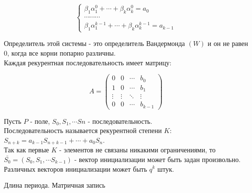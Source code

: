 \begin{equation*}
 \begin{cases}
    \beta_1\alpha_1^0 + \cdots + \beta_k\alpha_k^0 = a_0\\
    \cdots \cdots \cdots\\
    \beta_1\alpha_1^{k-1} + \cdots + \beta_k\alpha_k^{k-1} = a_{k-1}
 \end{cases}
\end{equation*}

Определитель этой системы - это определитель Вандермонда $(W)$ и он не равен 0,
когда все корни попарно различны.\\
Каждая рекурентная последовательность имеет матрицу:

\begin{displaymath}
A = \left(\begin{array}{lccr}
0 & 0 & \cdots & b_0\\
1 & 0 & \cdots & b_1\\
\vdots & \vdots & \ddots & \vdots\\
0 & 0 & \cdots & b_{k-1}
\end{array}\right)
\end{displaymath}

Пусть $P$ - поле, $S_0, S_1, \cdots Sn$ - последовательность.\\
Последовательность называется рекурентной степени $K$: $S_{n+k} = a_{k-1}
S_{n+k-1} + \cdots + a_0 S_n$.\\
Так как первые $K$ - элементов не связаны никакими ограничениями, то $\bar{S_0}
= (S_0, S_1, \cdots S_{k-1})$ - вектор
инициализации может быть задан произвольно. Различных векторов инициализации
может быть $q^k$ штук.\\

\begin{title}
  Длина периода. Матричная запись
\end{title}

